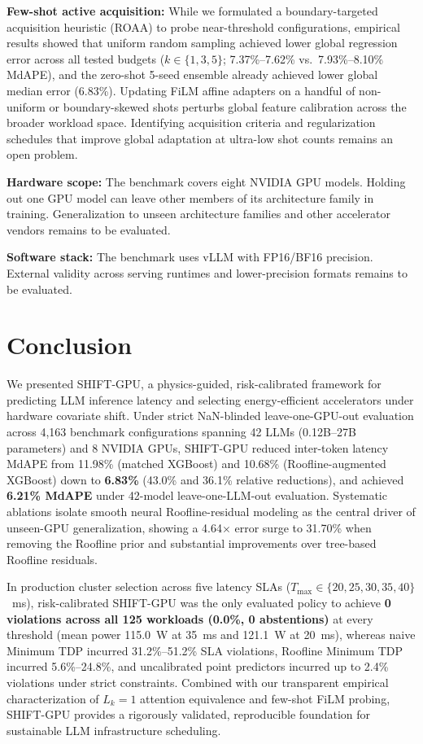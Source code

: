 \documentclass[preprint,12pt]{elsarticle}
\begin{document}
\textbf{Few-shot active acquisition:}
While we formulated a boundary-targeted acquisition heuristic (ROAA) to probe near-threshold configurations, empirical results showed that uniform random sampling achieved lower global regression error across all tested budgets ($k \in \{1, 3, 5\}$; 7.37\%--7.62\% vs.\ 7.93\%--8.10\% MdAPE), and the zero-shot 5-seed ensemble already achieved lower global median error (6.83\%). Updating FiLM affine adapters on a handful of non-uniform or boundary-skewed shots perturbs global feature calibration across the broader workload space. Identifying acquisition criteria and regularization schedules that improve global adaptation at ultra-low shot counts remains an open problem.

\textbf{Hardware scope:}
The benchmark covers eight NVIDIA GPU models. Holding out one GPU model can leave other members of its architecture family in training. Generalization to unseen architecture families and other accelerator vendors remains to be evaluated.

\textbf{Software stack:}
The benchmark uses vLLM with FP16/BF16 precision. External validity across serving runtimes and lower-precision formats remains to be evaluated.

\section{Conclusion}
\label{sec:conclusion}

We presented SHIFT-GPU, a physics-guided, risk-calibrated framework for predicting LLM inference latency and selecting energy-efficient accelerators under hardware covariate shift. Under strict NaN-blinded leave-one-GPU-out evaluation across 4,163 benchmark configurations spanning 42 LLMs (0.12B--27B parameters) and 8 NVIDIA GPUs, SHIFT-GPU reduced inter-token latency MdAPE from 11.98\% (matched XGBoost) and 10.68\% (Roofline-augmented XGBoost) down to \textbf{6.83\%} (43.0\% and 36.1\% relative reductions), and achieved \textbf{6.21\% MdAPE} under 42-model leave-one-LLM-out evaluation. Systematic ablations isolate smooth neural Roofline-residual modeling as the central driver of unseen-GPU generalization, showing a 4.64$\times$ error surge to 31.70\% when removing the Roofline prior and substantial improvements over tree-based Roofline residuals.

In production cluster selection across five latency SLAs ($T_{\max} \in \{20, 25, 30, 35, 40\}$~ms), risk-calibrated SHIFT-GPU was the only evaluated policy to achieve \textbf{0 violations across all 125 workloads (0.0\%, 0 abstentions)} at every threshold (mean power 115.0~W at 35~ms and 121.1~W at 20~ms), whereas naive Minimum TDP incurred 31.2\%--51.2\% SLA violations, Roofline Minimum TDP incurred 5.6\%--24.8\%, and uncalibrated point predictors incurred up to 2.4\% violations under strict constraints. Combined with our transparent empirical characterization of $L_k=1$ attention equivalence and few-shot FiLM probing, SHIFT-GPU provides a rigorously validated, reproducible foundation for sustainable LLM infrastructure scheduling.
\end{document}
